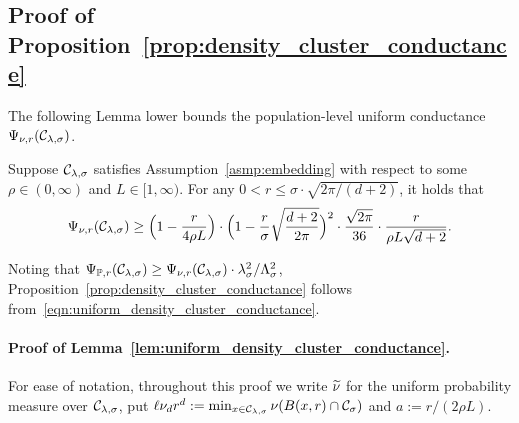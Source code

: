 \subsection{Proof of Proposition~\ref{prop:density_cluster_conductance}}
\label{subsec:density_cluster_conductance}
The following Lemma lower bounds the population-level uniform conductance $\Psi_{\nu,r}(\mathcal{C}_{\lambda,\sigma})$.
\begin{lemma}
	\label{lem:uniform_density_cluster_conductance}
	Suppose $\mathcal{C}_{\lambda,\sigma}$ satisfies Assumption~\ref{asmp:embedding} with respect to some $\rho \in (0,\infty)$ and $L \in [1,\infty)$. For any $0 < r \leq \sigma \cdot \sqrt{2\pi/(d + 2)}$, it holds that
	\begin{equation}
	\label{eqn:uniform_density_cluster_conductance}
	\Psi_{\nu,r}(\mathcal{C}_{\lambda,\sigma}) \geq \Bigl(1 - \frac{r}{4\rho L}\Bigr) \cdot \Bigl(1 - \frac{r}{\sigma}\sqrt{\frac{d + 2}{2\pi}}\Bigr)^2 \cdot \frac{\sqrt{2\pi}}{36} \cdot \frac{r}{\rho L \sqrt{d + 2}}.
	\end{equation}
\end{lemma}
Noting that $\Psi_{\mathbb{P},r}(\mathcal{C}_{\lambda,\sigma}) \geq \Psi_{\nu,r}(\mathcal{C}_{\lambda,\sigma}) \cdot \lambda_{\sigma}^2/\Lambda_{\sigma}^2$, Proposition~\ref{prop:density_cluster_conductance} follows from~\eqref{eqn:uniform_density_cluster_conductance}. 

\paragraph{Proof of Lemma~\ref{lem:uniform_density_cluster_conductance}.}
	For ease of notation, throughout this proof we write $\widetilde{\nu}$ for the uniform probability measure over $\mathcal{C}_{\lambda,\sigma}$, put $\ell \nu_d r^d := \min_{x \in \mathcal{C}_{\lambda,\sigma}}\nu(B(x,r) \cap \mathcal{C}_{\sigma})$ and $a := r/(2\rho L)$. 
	
